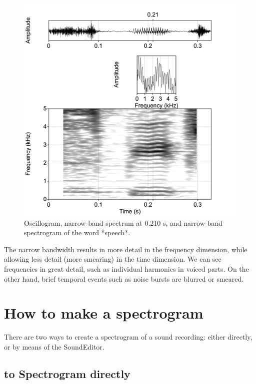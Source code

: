 \documentclass[
]{book}
\begin{document}
\begin{figure}

{\centering \includegraphics{figures/speech_word_spectrogram_30ms} 

}

\caption{Oscillogram, narrow-band spectrum at 0.210 s, and narrow-band spectrogram of the word *speech*.}\label{fig:speech-word-spectrogram-narrow}
\end{figure}

The narrow bandwidth results in more detail in the frequency dimension, while allowing less detail (more smearing) in the time dimension. We can see frequencies in great detail, such as individual harmonics in voiced parts. On the other hand, brief temporal events such as noise bursts are blurred or smeared.

\label{box-praatspectrogram}
\section{How to make a spectrogram}\label{sec:howto-spectrogram}

There are two ways to create a spectrogram of a sound recording: either directly, or by means of the SoundEditor.

\subsection{to Spectrogram directly}\label{to-spectrogram-directly}
\end{document}
